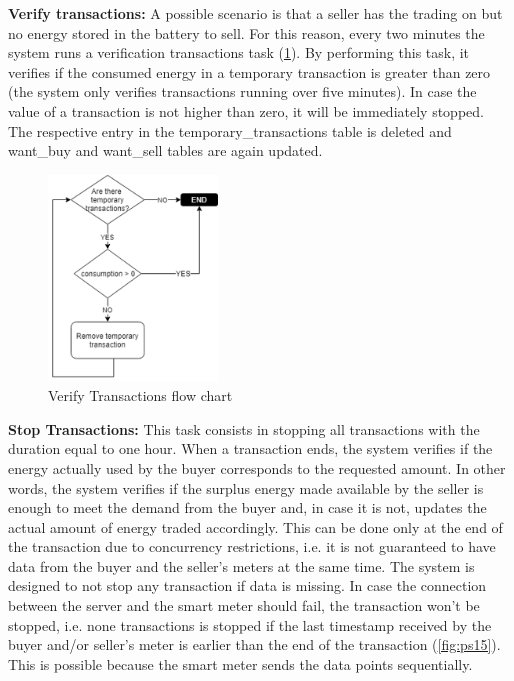 \textbf{Verify transactions:} A possible scenario is that a seller has the trading on but no energy stored in the battery to sell. For this reason, every two minutes the system runs a verification transactions task (\cref{fig:ps14}). By performing this task, it verifies if the consumed energy in a temporary transaction is greater than zero (the system only verifies transactions running over five minutes). In case the value of a transaction is not higher than zero, it will be immediately stopped. The respective entry in the temporary\_transactions table is deleted and want\_buy and want\_sell tables are again updated.


\begin{figure}[h]
\centering
\includegraphics[width=0.4\textwidth]{./Images/ps14}
\caption{Verify Transactions flow chart}
\label{fig:ps14}
\end{figure}


\textbf{Stop Transactions:} This task consists in stopping all transactions with the duration equal to one hour. When a transaction ends, the system verifies if the energy actually used  by the buyer corresponds to the requested amount. In other words, the system verifies if the surplus energy made available by the seller is enough to meet the demand from the buyer and, in case it is not, updates the actual amount of energy traded accordingly. This can be done only at the end of the transaction due to concurrency restrictions, i.e. it is not guaranteed to have data from the buyer and the seller’s meters at the same time. The system is designed to not  stop any transaction if data is missing. In case the connection between the server and the smart meter should fail, the transaction won’t be stopped, i.e. none transactions is stopped if the last timestamp received by the buyer and/or seller’s meter is earlier than the end of the transaction (\cref{fig:ps15}). This is possible because the smart meter sends the data points sequentially.



